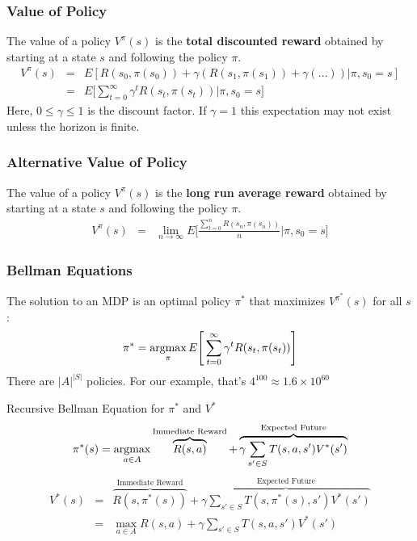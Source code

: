 \documentclass[ignorenonframetext]{beamer}
\newcommand{\argmax}{\operatornamewithlimits{argmax}}
\begin{document}
\begin{frame}
	\frametitle{Value of Policy}
		The value of a policy $V^\pi(s)$ is the \textbf{total discounted
		reward} obtained by starting at a state $s$ and following the
		policy $\pi$.
		\begin{eqnarray*}	
			V^\pi(s) &=& E[R(s_0,\pi(s_0)) + \gamma (R(s_1,\pi(s_1)) + \gamma( \dots
			)) | \pi, s_0 = s]\\
			&=& E \Bigg[\sum_{t=0}^\infty \gamma^t R(s_t,\pi(s_t)) \Big| \pi, s_0 =
			s  \Bigg]
		\end{eqnarray*}	
		Here, $0 \leq \gamma \leq 1$ is the discount factor. If $\gamma =
		1$ this expectation may not exist unless the horizon is finite.
\end{frame}

\begin{frame}
	\frametitle{Alternative Value of Policy}
		The value of a policy $V^\pi(s)$ is the \textbf{long run average
		reward} obtained by starting at a state $s$ and following the
		policy $\pi$.
		\begin{eqnarray*}	
			V^\pi(s) &=& \lim_{n \to \infty} E\Bigg[\frac{\sum_{t=0}^n
			R(s_n,\pi(s_n))}{n}\Big| \pi, s_0 = s\Bigg]
		\end{eqnarray*}	
\end{frame}

\begin{frame}[allowframebreaks]
	\frametitle{Bellman Equations}
	The solution to an MDP is an optimal policy $\pi^*$ that maximizes
	$V^{\pi^*}(s)$ for all $s$:
	\[
	\pi^* = \argmax_{\pi} E\Bigg[\sum_{t=0}^\infty \gamma^t
	R(s_t,\pi(s_t))\Bigg] 
	\]
	There are $|A|^{|S|}$ policies.  For our example, that's $4^{100}
	\approx 1.6\times 10^{60}$

	\begin{block}{Recursive Bellman Equation for $\pi^*$ and $V^*$
		\footnotemark}
		\[
		\pi^*(s) = \argmax_{a\in A} \overbrace{R(s,a)}^\text{Immediate
		Reward} + \overbrace{\gamma \sum_{s'\in S}
		T(s,a,s')V^*(s')}^\text{Expected Future}
		\]
		\begin{eqnarray*}
			V^*(s) &=& \overbrace{R(s,\pi^*(s))}^\text{Immediate Reward}+
			\overbrace{\gamma \sum_{s' \in S}T(s,\pi^*(s), s')
			V^*(s')}^\text{Expected Future}\\ 
			&=& \max_{a \in A} R(s,a) + \gamma \sum_{s' \in S}T(s,a, s')
			V^*(s')
		\end{eqnarray*}
	\end{block}
\end{frame}
\end{document}
